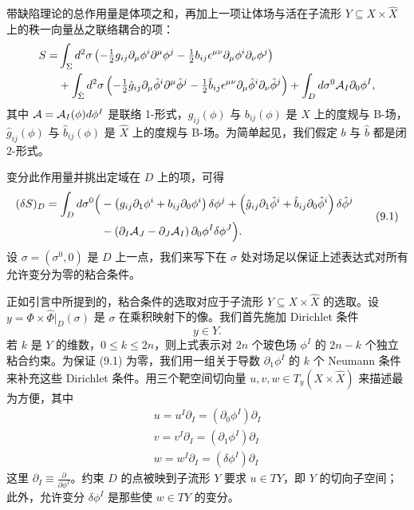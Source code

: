 带缺陷理论的总作用量是体项之和，再加上一项让体场与活在子流形 $Y\subseteq X\times\hat X$ 上的秩一向量丛之联络耦合的项：
\begin{equation*}
\begin{aligned}
S=&\int_\Sigma d^2\sigma\left(-\tfrac12 g_{ij}\partial_\mu\phi^i\partial^\mu\phi^j-\tfrac12 b_{ij}\epsilon^{\mu\nu}\partial_\mu\phi^i\partial_\nu\phi^j\right)\\
&+\int_{\hat\Sigma}d^2\sigma\left(-\tfrac12\hat g_{ij}\partial_\mu\hat\phi^i\partial^\mu\hat\phi^j-\tfrac12\hat b_{ij}\epsilon^{\mu\nu}\partial_\mu\hat\phi^i\partial_\nu\hat\phi^j\right)+\int_D d\sigma^0 \mathcal{A}_I\partial_0\phi^I,
\end{aligned}
\end{equation*}
其中 $\mathcal{A}=\mathcal{A}_I(\phi)d\phi^I$ 是联络 1-形式，$g_{ij}(\phi)$ 与 $b_{ij}(\phi)$ 是 $X$ 上的度规与 B-场，$\hat g_{ij}(\phi)$ 与 $\hat b_{ij}(\phi)$ 是 $\hat X$ 上的度规与 B-场。为简单起见，我们假定 $b$ 与 $\hat b$
都是闭 2-形式。

变分此作用量并挑出定域在 $D$ 上的项，可得
\begin{equation}
\begin{aligned}
(\delta S)_D=\int_D d\sigma^0\Big(&-\left(g_{ij}\partial_1\phi^i+b_{ij}\partial_0\phi^i\right)\delta\phi^j+\left(\hat g_{ij}\partial_1\hat\phi^i+\hat b_{ij}\partial_0\hat\phi^i\right)\delta\hat\phi^j\\
&-\left(\partial_I\mathcal{A}_J-\partial_J\mathcal{A}_I\right)\partial_0\phi^I\delta\phi^J\Big).
\end{aligned}
\tag{9.1}
\end{equation}
设 $\sigma=(\sigma^0,0)$ 是 $D$ 上一点，我们来写下在 $\sigma$ 处对场足以保证上述表达式对所有允许变分为零的粘合条件。

正如引言中所提到的，粘合条件的选取对应于子流形 $Y\subseteq X\times\hat X$ 的选取。设 $y=\Phi\times\hat\Phi|_D(\sigma)$ 是 $\sigma$ 在乘积映射下的像。我们首先施加 Dirichlet 条件
\[
y\in Y.
\]
若 $k$ 是 $Y$ 的维数，$0\le k\le 2n$，则上式表示对 $2n$ 个玻色场 $\phi^I$ 的 $2n-k$ 个独立粘合约束。为保证 (9.1) 为零，我们用一组关于导数 $\partial_1\phi^I$ 的 $k$ 个 Neumann 条件来补充这些 Dirichlet 条件。用三个靶空间切向量 $u,v,w\in T_y(X\times\hat X)$ 来描述最为方便，其中
\begin{gather*}
u=u^I\partial_I=(\partial_0\phi^I)\partial_I \\
v=v^I\partial_I=(\partial_1\phi^I)\partial_I \\
w=w^I\partial_I=(\delta\phi^I)\partial_I 
\end{gather*}
这里 $\partial_I\equiv\frac{\partial}{\partial\phi^I}$。约束 $D$ 的点被映到子流形 $Y$ 要求 $u\in TY$，即 $Y$ 的切向子空间；此外，允许变分 $\delta\phi^I$ 是那些使 $w\in TY$ 的变分。

